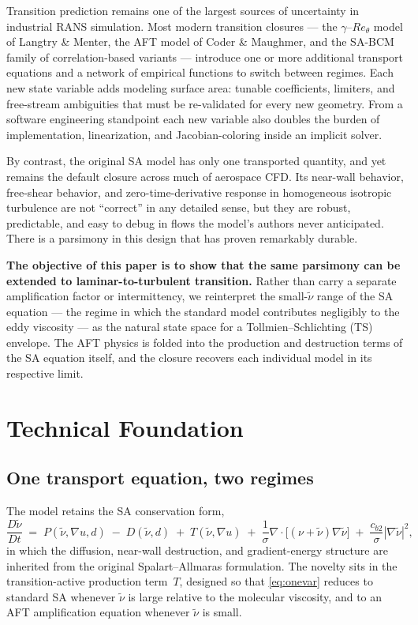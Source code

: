 \documentclass[11pt]{article}
\begin{document}
Transition prediction remains one of the largest sources of uncertainty in
industrial RANS simulation. Most modern transition closures
--- the $\gamma$--$Re_\theta$ model of Langtry \& Menter, the AFT model of
Coder \& Maughmer, and the SA-BCM family of correlation-based variants ---
introduce one or more additional transport equations and a network of
empirical functions to switch between regimes. Each new state variable adds
modeling surface area: tunable coefficients, limiters, and free-stream
ambiguities that must be re-validated for every new geometry. From a software
engineering standpoint each new variable also doubles the burden of
implementation, linearization, and Jacobian-coloring inside an implicit
solver.

By contrast, the original SA model has only one transported quantity, and yet
remains the default closure across much of aerospace CFD. Its near-wall
behavior, free-shear behavior, and zero-time-derivative response in
homogeneous isotropic turbulence are not ``correct'' in any detailed sense,
but they are robust, predictable, and easy to debug in flows the model's
authors never anticipated. There is a parsimony in this design that has
proven remarkably durable.

\textbf{The objective of this paper is to show that the same parsimony can be
extended to laminar-to-turbulent transition.} Rather than carry a separate
amplification factor or intermittency, we reinterpret the small-$\tilde\nu$
range of the SA equation --- the regime in which the standard model
contributes negligibly to the eddy viscosity --- as the natural state space
for a Tollmien--Schlichting (TS) envelope. The AFT physics is folded into the
production and destruction terms of the SA equation itself, and the closure
recovers each individual model in its respective limit.

\section{Technical Foundation}

\subsection{One transport equation, two regimes}

The model retains the SA conservation form,
\begin{equation}
\frac{D\tilde\nu}{Dt} \;=\; P(\tilde\nu, \nabla u, d) \;-\; D(\tilde\nu, d)
\;+\; T(\tilde\nu, \nabla u) \;+\; \frac{1}{\sigma}\nabla\!\cdot\!\big[(\nu+\tilde\nu)\nabla\tilde\nu\big]
\;+\; \frac{c_{b2}}{\sigma}|\nabla\tilde\nu|^2,
\label{eq:onevar}
\end{equation}
in which the diffusion, near-wall destruction, and gradient-energy structure
are inherited from the original Spalart--Allmaras formulation. The novelty
sits in the transition-active production term~$T$, designed so that
\eqref{eq:onevar} reduces to standard SA whenever $\tilde\nu$ is large
relative to the molecular viscosity, and to an AFT amplification equation
whenever $\tilde\nu$ is small.
\end{document}
